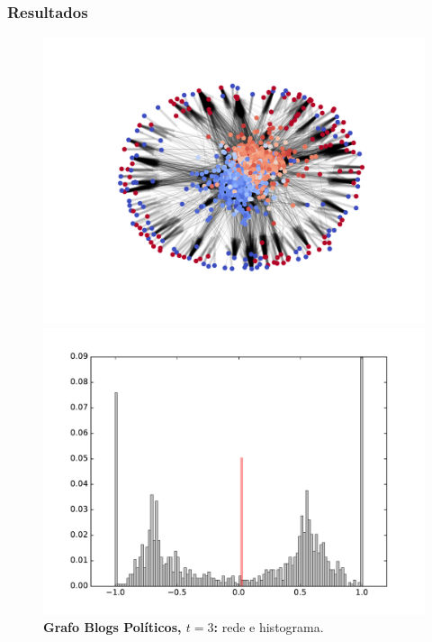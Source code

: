 \begin{frame}
  \frametitle{Resultados}

  \begin{figure}
  \centering
  \begin{minipage}{5.5cm}
    \includegraphics[width=\textwidth]{./figures/99N003}
  \end{minipage}
  \begin{minipage}{5.5cm}
    \includegraphics[width=\textwidth]{./figures/99H003}
  \end{minipage}
  \vspace{5mm}
  \caption*{\textbf{Grafo Blogs Políticos, $t = 3$:} rede e histograma.}
  \end{figure}
\end{frame}

